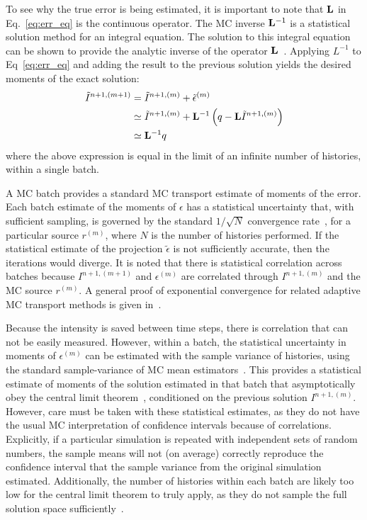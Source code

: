 To see why the true error is being estimated, it is important to note that 
$\mathbf{L}$ in Eq.~\eqref{eq:err_eq} is the continuous operator.  The MC inverse $\mathbf{L}^{-1}$ is
a statistical solution method for an integral equation.  The solution to this integral
equation can be shown to provide the analytic inverse of the operator $\mathbf{L}$~\cite{shultis_mc,cj_thesis}.  Applying $L^{-1}$ to Eq~\eqref{eq:err_eq} and adding the
result to the previous solution yields the desired moments of the exact solution:
\begin{align}
   \tilde I^{n+1,(m+1)} &= \tilde I^{n+1,(m)} + \tilde\epsilon^{(m)} \\
                  &\simeq  \tilde I^{n+1,(m)} + \mathbf{L}^{-1} \left(q - \mathbf{L} \tilde I^{n+1,(m)} \right) \\
                  &\simeq \mathbf{L}^{-1} q
\end{align}
where the above expression is equal in the limit of an infinite number of histories,
within a single batch.  

A MC batch provides a standard MC transport estimate of moments of the error.  Each batch
estimate of the moments of $\epsilon$ has a statistical uncertainty that, with sufficient
sampling, is governed by the standard $1/\sqrt{N}$ convergence rate~\cite{shultis_mc}, for a
particular source $r^{(m)}$, where $N$ is the number of histories performed.  If the statistical estimate of the projection $\tilde\epsilon$ is not sufficiently
accurate, then the iterations would diverge. It is noted that there is statistical correlation across batches because
$I^{n+1,(m+1)}$ and $\epsilon^{(m)}$ are correlated through $I^{n+1,(m)}$ and the MC source $r^{(m)}$.  
A general proof of exponential
convergence for related adaptive MC transport methods is given in~\cite{spanier_mc}.  

Because the intensity is saved between time steps, there is correlation that
can not be easily measured.  However, within a batch, the statistical uncertainty in moments of $\epsilon^{(m)}$ can be estimated with the
sample variance of histories, using the standard sample-variance of MC mean
estimators~\cite{shultis_mc}.  This provides a statistical estimate of moments
of the solution estimated in that batch that asymptotically obey the central
limit theorem~\cite{shultis_mc}, conditioned on the previous solution
$I^{n+1,(m)}$.  However, care must be taken with these statistical estimates,
as they do not have the usual MC interpretation of confidence intervals because
of correlations.  Explicitly, if a particular simulation is repeated with
independent sets of random numbers, the sample means will not (on average)
correctly reproduce the confidence interval that the sample variance from the
original simulation estimated.  Additionally, the number of histories within
each batch are likely too low  for the central limit theorem to truly apply, as
they  do not sample the full solution space sufficiently~\cite{mcnp}.  

